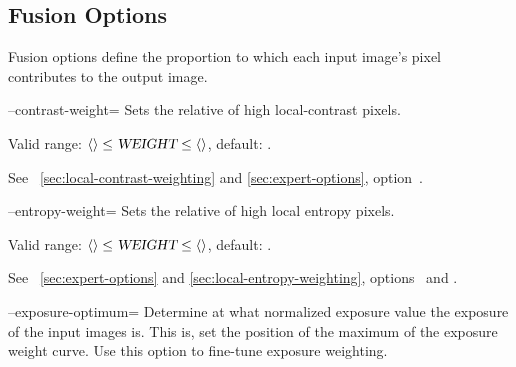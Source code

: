 

\subsection[Fusion Options]{\label{sec:fusion-options}%
  Fusion Options}

Fusion options define the proportion to which each input image's pixel contributes to the output
image.

\begin{codelist}
  \label{opt:contrast-weight}%
\item[--contrast-weight=\metavar{WEIGHT}]\itemend
  Sets the relative  of high local-contrast pixels.

  Valid range: $\val{val:minimum-weight-contrast} \leq \metavar{WEIGHT} \leq
  \val{val:maximum-weight-contrast}$, default: .

  See \sectionName~\ref{sec:local-contrast-weighting} and \ref{sec:expert-options},
  option~.


  \label{opt:entropy-weight}%
\item[--entropy-weight=\metavar{WEIGHT}]\itemend
  Sets the relative  of high local entropy pixels.

  Valid range: $\val{val:minimum-weight-entropy} \leq \metavar{WEIGHT} \leq
  \val{val:maximum-weight-entropy}$, default: .

  See \sectionName~\ref{sec:expert-options} and \ref{sec:local-entropy-weighting},
  options~ and
  .


  \label{opt:exposure-optimum}%
\item[--exposure-optimum=\metavar{OPTIMUM}]\itemend
  Determine at what normalized exposure value the  exposure of the input images
  is.  This is, set the position of the maximum of the exposure weight curve.  Use this option
  to fine-tune exposure weighting.


\end{codelist}
